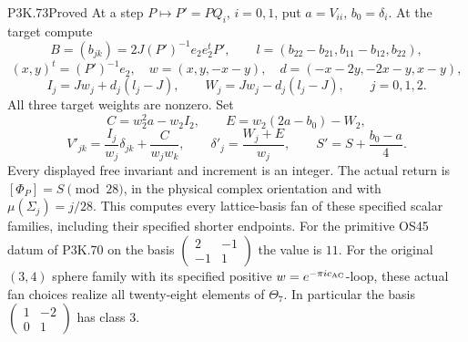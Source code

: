 \begin{statement}{P3K.73}{Proved}
At a step \(P\mapsto P'=PQ_i\), \(i=0,1\), put
\(a=V_{ii}\), \(b_0=\delta_i\). At the target compute
\[
 B=(b_{jk})=2J(P')^{-1}e_2e_2^tP',\qquad
 l=(b_{22}-b_{21},b_{11}-b_{12},b_{22}),
\]
\[
 (x,y)^t=(P')^{-1}e_2,\quad
 w=(x,y,-x-y),\quad d=(-x-2y,-2x-y,x-y),
\]
\[
 I_j=Jw_j+d_j(l_j-J),\qquad
 W_j=Jw_j-d_j(l_j-J),\qquad j=0,1,2.
 \tag{P3K.73.3}
\]
All three target weights are nonzero. Set
\[
 C=w_2^2a-w_2I_2,\qquad E=w_2(2a-b_0)-W_2,
\]
\[
 V'_{jk}=\frac{I_j}{w_j}\delta_{jk}+\frac{C}{w_jw_k},
 \qquad \delta'_j=\frac{W_j+E}{w_j},\qquad
 S'=S+\frac{b_0-a}{4}.
 \tag{P3K.73.4}
\]
Every displayed free invariant and increment is an integer.
The actual return is \([\Phi_P]=S\pmod{28}\), in the physical
complex orientation and with \(\mu(\Sigma_j)=j/28\).
This computes every lattice-basis fan of these specified scalar
families, including their specified shorter endpoints. For the
primitive OS45 datum of P3K.70 on the basis
\(\left(\begin{smallmatrix}2&-1\\-1&1\end{smallmatrix}\right)\)
the value is \(11\).
For the original \((3,4)\) sphere family with its specified positive
\(w=e^{-\pi i c_{\rm AC}}\)-loop, these actual fan choices realize
all twenty-eight elements of \(\Theta_7\). In particular the basis
\(\left(\begin{smallmatrix}1&-2\\0&1\end{smallmatrix}\right)\)
has class \(3\).
\end{statement}
